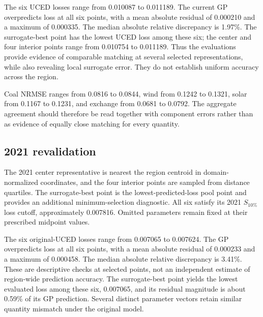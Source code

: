 \documentclass[11pt,a4paper]{article}
\begin{document}
\begin{center}
\label{tab:revalidation2016}
\small
\end{center}
The six UCED losses range from 0.010087 to 0.011189. The current GP
overpredicts loss at all six points, with a mean absolute residual of
0.000210 and a maximum of 0.000335. The median absolute relative discrepancy
is 1.97\%. The surrogate-best point has the lowest UCED loss among these six;
the center and four interior points range from 0.010754 to 0.011189. Thus the
evaluations provide evidence of comparable
matching at several selected representations, while also revealing local
surrogate error. They do not establish uniform accuracy across the region.

\begin{center}
\label{tab:components2016}
\small
\end{center}
Coal NRMSE ranges from 0.0816 to 0.0844, wind from 0.1242 to 0.1321,
solar from 0.1167 to 0.1231, and exchange from 0.0681 to 0.0792.
The aggregate agreement should therefore be read together with component
errors rather than as evidence of equally close matching for every quantity.

\newpage
\subsection{2021 revalidation}
The 2021 center representative is nearest the region centroid in
 domain-normalized coordinates, and the four interior points are sampled
from distance quartiles. The surrogate-best point is the lowest-predicted-loss
pool point and provides an additional minimum-selection diagnostic.
All six satisfy its 2021 $S_{10\%}$ loss cutoff, approximately 0.007816.
Omitted parameters remain fixed at their prescribed midpoint values.

\begin{center}
\label{tab:revalidation}
\small
\end{center}
The six original-UCED losses range from 0.007065 to 0.007624. The GP
overpredicts loss at all six points, with a mean absolute residual of
0.000233 and a maximum of 0.000458. The median absolute relative discrepancy
is 3.41\%. These are descriptive checks at selected
points, not an independent estimate of region-wide prediction accuracy.
The surrogate-best point yields the lowest evaluated loss among these six,
0.007065, and its residual magnitude is about 0.59\% of its GP prediction.
Several distinct parameter vectors retain similar
quantity mismatch under the original model.
\end{document}

